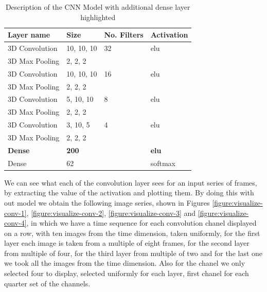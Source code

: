\documentclass[12pt]{article}
\theoremstyle{definition}
\begin{document}
	\begin{table}[ht]
		\centering
		\renewcommand{\arraystretch}{1.5}

		\caption{Description of the CNN Model with additional dense layer highlighted}
		\label{table:dense-CNN}

		\begin{tabularx}{\textwidth}{XXXX}
			\textbf{Layer name} & \textbf{Size} & \textbf{No. Filters} & \textbf{Activation} \\ \hline
			3D Convolution    & 10, 10, 10   & 32                   & elu                  \\ \hline
			3D Max Pooling    & 2, 2, 2      & \textbf{\textendash} & \textbf{\textendash} \\ \hline
			3D Convolution    & 10, 10, 10   & 16                   & elu                  \\ \hline
			3D Max Pooling    & 2, 2, 2      & \textbf{\textendash} & \textbf{\textendash} \\ \hline
			3D Convolution    & 5, 10, 10    & 8                    & elu                  \\ \hline
			3D Max Pooling    & 2, 2, 2      & \textbf{\textendash} & \textbf{\textendash} \\ \hline
			3D Convolution    & 3, 10, 5     & 4                    & elu                  \\ \hline
			3D Max Pooling    & 2, 2, 2      & \textbf{\textendash} & \textbf{\textendash} \\ \hline
			\rowcolor{Gray}
			\textbf{Dense} & \textbf{200} & \textbf{\textendash} & \textbf{elu}         \\ \hline
			Dense          & 62           & \textbf{\textendash} & softmax              \\
		\end{tabularx}
	\end{table}

	We can see what each of the convolution layer sees for an input series of frames, by extracting the value of the activation and plotting them. By doing this with out model we obtain the following image series, shown in Figures \ref{figure:visualize-conv-1}, \ref{figure:visualize-conv-2}, \ref{figure:visualize-conv-3} and \ref{figure:visualize-conv-4}, in which we have a time sequence for each convolution chanel displayed on a row, with ten images from the time dimension, taken uniformly, for the first layer each image is taken from a multiple of eight frames, for the second layer from multiple of four, for the third layer from multiple of two and for the last one we took all the images from the time dimension. Also for the chanel we only selected four to display, selected uniformly for each layer, first chanel for each quarter set of the channels.
\end{document}
